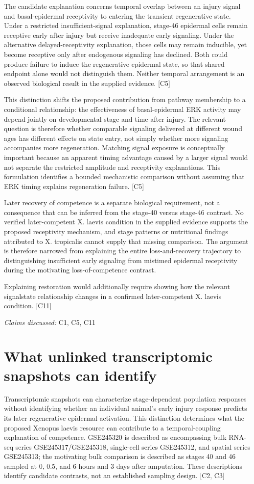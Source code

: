 \documentclass[11pt]{article}
\begin{document}
The candidate explanation concerns temporal overlap between an injury signal and basal-epidermal receptivity to entering the transient regenerative state. Under a restricted insufficient-signal explanation, stage-46 epidermal cells remain receptive early after injury but receive inadequate early signaling. Under the alternative delayed-receptivity explanation, those cells may remain inducible, yet become receptive only after endogenous signaling has declined. Both could produce failure to induce the regenerative epidermal state, so that shared endpoint alone would not distinguish them. Neither temporal arrangement is an observed biological result in the supplied evidence. [C5]

This distinction shifts the proposed contribution from pathway membership to a conditional relationship: the effectiveness of basal-epidermal ERK activity may depend jointly on developmental stage and time after injury. The relevant question is therefore whether comparable signaling delivered at different wound ages has different effects on state entry, not simply whether more signaling accompanies more regeneration. Matching signal exposure is conceptually important because an apparent timing advantage caused by a larger signal would not separate the restricted amplitude and receptivity explanations. This formulation identifies a bounded mechanistic comparison without assuming that ERK timing explains regeneration failure. [C5]

Later recovery of competence is a separate biological requirement, not a consequence that can be inferred from the stage-40 versus stage-46 contrast. No verified later-competent X. laevis condition in the supplied evidence supports the proposed receptivity mechanism, and stage patterns or nutritional findings attributed to X. tropicalis cannot supply that missing comparison. The argument is therefore narrowed from explaining the entire loss-and-recovery trajectory to distinguishing insufficient early signaling from mistimed epidermal receptivity during the motivating loss-of-competence contrast.

Explaining restoration would additionally require showing how the relevant signal\textendash{}state relationship changes in a confirmed later-competent X. laevis condition. [C11]

\textit{Claims discussed: }C1, C5, C11
\section{What unlinked transcriptomic snapshots can identify}
Transcriptomic snapshots can characterize stage-dependent population responses without identifying whether an individual animal\textquoteright{}s early injury response predicts its later regenerative epidermal activation. This distinction determines what the proposed Xenopus laevis resource can contribute to a temporal-coupling explanation of competence. GSE245320 is described as encompassing bulk RNA-seq series GSE245317/GSE245318, single-cell series GSE245312, and spatial series GSE245313; the motivating bulk comparison is described as stages 40 and 46 sampled at $0$, $0.5$, and $6$ hours and $3$ days after amputation. These descriptions identify candidate contrasts, not an established sampling design. [C2, C3]
\end{document}
